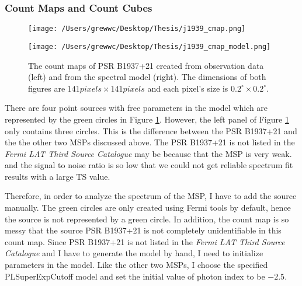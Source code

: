 \documentclass[12pt]{report}
\begin{document}
          \subsubsection{Count Maps and Count Cubes}
            \begin{figure}[!ht]
              \begin{center}
              \begin{minipage}{0.45\textwidth}
                \begin{center} 
                  \texttt{[image: /Users/grewwc/Desktop/Thesis/j1939\_cmap.png]}
                \end{center}
              \end{minipage}
              \begin{minipage}{0.45\textwidth}
                \begin{center}
                  \texttt{[image: /Users/grewwc/Desktop/Thesis/j1939\_cmap\_model.png]}
                \end{center}
              \end{minipage}
            \end{center}
 
          \caption{The count maps of PSR B1937+21 created from observation 
              data (\textsf{left}) and from the spectral model (\textsf{right}). The dimensions
              of both figures are $141 pixels \times 141 pixels$ and each pixel's size is
              $0.2^{\circ}\times0.2^{\circ}$.}
            \label{fig: j1939_count_map}
          \end{figure}

          There are four point sources with free parameters in the model which are represented 
          by the green circles in Figure \ref{fig: j1939_count_map}.
          However, the left panel of Figure \ref{fig: j1939_count_map} only contains three 
          circles. This is the difference between the PSR B1937+21 and the the other two MSPs 
          discussed above. The PSR B1937+21 is not listed in the 
          \textit{Fermi LAT Third Source Catalogue} may be because that the MSP is very weak.
          and the signal to noise ratio is so low that we could not get reliable spectrum fit 
          results with a large TS value. 

          Therefore, in order to analyze the spectrum of the MSP, I have to add the source 
          manually. The green circles are only created using Fermi tools by default, hence 
          the source is not represented by a green circle. In addition, the count map is so 
          messy that the source PSR B1937+21 is not completely unidentifiable in this count map. 
          Since PSR B1937+21 is not listed in the \textit{Fermi LAT Third Source Catalogue} 
          and I have to generate the model by hand, I need to initialize parameters in the 
          model. Like the other two MSPs, I choose the specified PLSuperExpCutoff model and 
          set the initial value of photon index to be $-2.5$.
\end{document}
